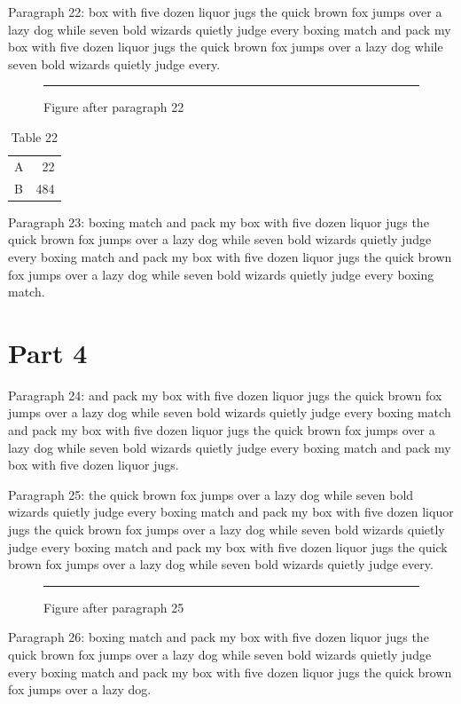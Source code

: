 \documentclass[twocolumn]{article}
\begin{document}
Paragraph 22: box with five dozen liquor jugs the quick brown fox jumps over a lazy dog while seven bold wizards quietly judge every boxing match and pack my box with five dozen liquor jugs the quick brown fox jumps over a lazy dog while seven bold wizards quietly judge every.

\begin{figure}[htbp]\centering\rule{0.8\columnwidth}{5em}\caption{Figure after paragraph 22}\end{figure}
\begin{table}[htb]\centering\begin{tabular}{lr}A & 22\\ B & 484\end{tabular}\caption{Table 22}\end{table}
Paragraph 23: boxing match and pack my box with five dozen liquor jugs the quick brown fox jumps over a lazy dog while seven bold wizards quietly judge every boxing match and pack my box with five dozen liquor jugs the quick brown fox jumps over a lazy dog while seven bold wizards quietly judge every boxing match.

\section{Part 4}
Paragraph 24: and pack my box with five dozen liquor jugs the quick brown fox jumps over a lazy dog while seven bold wizards quietly judge every boxing match and pack my box with five dozen liquor jugs the quick brown fox jumps over a lazy dog while seven bold wizards quietly judge every boxing match and pack my box with five dozen liquor jugs.

Paragraph 25: the quick brown fox jumps over a lazy dog while seven bold wizards quietly judge every boxing match and pack my box with five dozen liquor jugs the quick brown fox jumps over a lazy dog while seven bold wizards quietly judge every boxing match and pack my box with five dozen liquor jugs the quick brown fox jumps over a lazy dog while seven bold wizards quietly judge every.

\begin{figure}[tbp]\centering\rule{0.8\columnwidth}{8em}\caption{Figure after paragraph 25}\end{figure}
Paragraph 26: boxing match and pack my box with five dozen liquor jugs the quick brown fox jumps over a lazy dog while seven bold wizards quietly judge every boxing match and pack my box with five dozen liquor jugs the quick brown fox jumps over a lazy dog.
\end{document}
